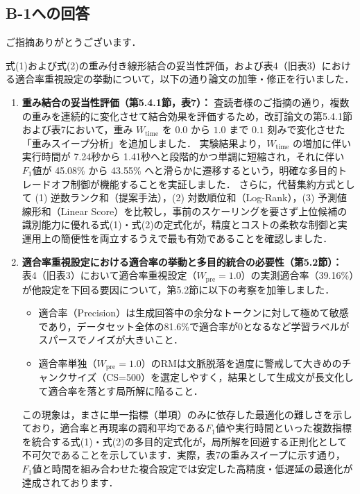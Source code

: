 \documentclass{jsarticle}
\begin{document}
\subsection*{B-1への回答}
ご指摘ありがとうございます．

式(1)および式(2)の重み付き線形結合の妥当性評価，および表4（旧表3）における適合率重視設定の挙動について，以下の通り論文の加筆・修正を行いました．

\begin{enumerate}
\item \textbf{重み結合の妥当性評価（第5.4.1節，表7）：}
査読者様のご指摘の通り，複数の重みを連続的に変化させて結合効果を評価するため，改訂論文の第5.4.1節および表7において，重み $W_{\mathrm{time}}$ を $0.0$ から $1.0$ まで $0.1$ 刻みで変化させた「重みスイープ分析」を追加しました．
実験結果より，$W_{\mathrm{time}}$ の増加に伴い実行時間が 7.24秒から 1.41秒へと段階的かつ単調に短縮され，それに伴い $F_1$値が 45.08\% から 43.55\% へと滑らかに遷移するという，明確な多目的トレードオフ制御が機能することを実証しました．
さらに，代替集約方式として (1) 逆数ランク和（提案手法），(2) 対数順位和（Log-Rank），(3) 予測値線形和（Linear Score）を比較し，事前のスケーリングを要さず上位候補の識別能力に優れる式(1)・式(2)の定式化が，精度とコストの柔軟な制御と実運用上の簡便性を両立するうえで最も有効であることを確認しました．

\item \textbf{適合率重視設定における適合率の挙動と多目的統合の必要性（第5.2節）：}
表4（旧表3）において適合率重視設定（$W_{\mathrm{pre}}=1.0$）の実測適合率（39.16\%）が他設定を下回る要因について，第5.2節に以下の考察を加筆しました．
\begin{itemize}
\item 適合率（Precision）は生成回答中の余分なトークンに対して極めて敏感であり，データセット全体の81.6\%で適合率が0となるなど学習ラベルがスパースでノイズが大きいこと．
\item 適合率単独（$W_{\mathrm{pre}}=1.0$）のRMは文脈脱落を過度に警戒して大きめのチャンクサイズ（CS=500）を選定しやすく，結果として生成文が長文化して適合率を落とす局所解に陥ること．
\end{itemize}
この現象は，まさに単一指標（単項）のみに依存した最適化の難しさを示しており，適合率と再現率の調和平均である$F_1$値や実行時間といった複数指標を統合する式(1)・式(2)の多目的定式化が，局所解を回避する正則化として不可欠であることを示しています．実際，表7の重みスイープに示す通り，$F_1$値と時間を組み合わせた複合設定では安定した高精度・低遅延の最適化が達成されております．
\end{enumerate}
\end{document}
